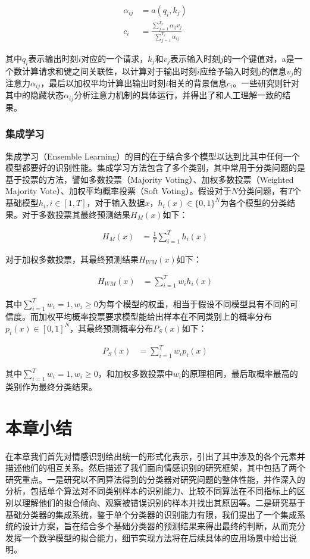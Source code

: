 \begin{align}
  \alpha_{ij} &= a(q_i, k_j) \\
  c_i &= \frac
    {\sum\limits_{j=1}^{T_x}{\alpha_{ij}v_j}}
    {\sum\limits_{j=1}^{T_x}{\alpha_{ij}}}
\end{align}

其中$q_i$表示输出时刻$i$对应的一个请求，$k_j$和$v_j$表示输入时刻$j$的一个键值对，a是一个数计算请求和键之间关联性，以计算对于输出时刻$i$应给予输入时刻$j$的信息$v_j$的注意力$\alpha_{ij}$，最后以加权平均计算出输出时刻$i$相关的背景信息$c_i$。一些研究\cite{wang2016attention}\cite{pontiki2014semeval}则针对其中的隐藏状态$\alpha_{ij}$分析注意力机制的具体运行，并得出了和人工理解一致的结果。

\subsubsection{集成学习}
\label{sssec:intro_ensemble_learning}

集成学习（Ensemble Learning）的目的在于结合多个模型以达到比其中任何一个模型都要好的识别性能。集成学习方法包含了多个类别，其中常用于分类问题的是基于投票的方法，譬如多数投票（Majority Voting）、加权多数投票（Weighted Majority Vote）、加权平均概率投票（Soft Voting）。假设对于$N$分类问题，有$T$个基础模型$h_i, i \in [1, T]$，对于输入数据$x$，$h_i(x) \in \{0, 1\}^N$为各个模型的分类结果。对于多数投票其最终预测结果$H_M(x)$如下：

\begin{align}
  H_{M}(x) &= \frac{1}{T} \sum\limits_{i=1}^{T}h_i(x)
\end{align}

对于加权多数投票，其最终预测结果$H_{WM}(x)$如下：

\begin{align}
  H_{WM}(x) &= \sum\limits_{i=1}^{T}w_i h_i(x)
\end{align}

其中$\sum\limits_{i=1}^{T}w_i = 1, w_i \geq 0$为每个模型的权重，相当于假设不同模型具有不同的可信度。而加权平均概率投票要求模型能给出样本在不同类别上的概率分布$p_i(x) \in [0, 1]^N$，其最终预测概率分布$P_S(x)$如下：

\begin{align}
  P_{S}(x) &= \sum\limits_{i=1}^{T}w_i p_i(x)
\end{align}

其中$\sum\limits_{i=1}^{T}w_i = 1, w_i \geq 0$，和加权多数投票中$w_i$的原理相同，最后取概率最高的类别作为最终分类结果。

\section{本章小结}

在本章我们首先对情感识别给出统一的形式化表示，引出了其中涉及的各个元素并描述他们的相互关系。然后描述了我们面向情感识别的研究框架，其中包括了两个研究重点。一是研究以不同算法得到的分类器对研究问题的整体性能，并作深入的分析，包括单个算法对不同类别样本的识别能力、比较不同算法在不同指标上的区别以理解他们的拟合倾向、观察被错误识别的样本并找出其原因等。二是研究基于基础分类器的集成系统，鉴于单个分类器的识别能力有限，我们提出了一个集成系统的设计方案，旨在结合多个基础分类器的预测结果来得出最终的判断，从而充分发挥一个数学模型的拟合能力，细节实现方法将在后续具体的应用场景中给出说明。



